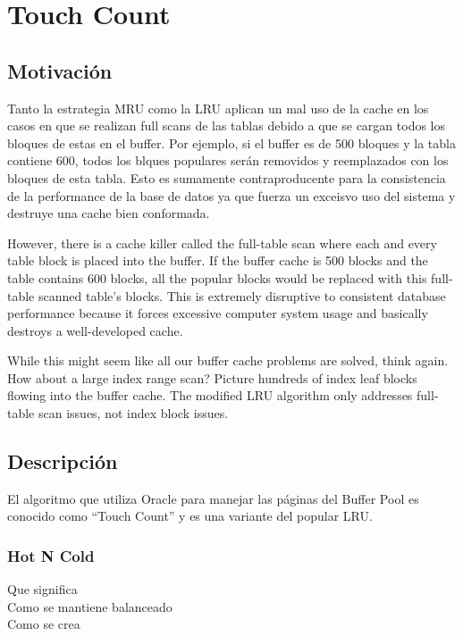 \section{Touch Count}

\subsection{Motivación}

Tanto la estrategia MRU como la LRU aplican un mal uso de la cache en los casos en que se realizan full scans de las tablas
debido a que se cargan todos los bloques de estas en el buffer. Por ejemplo, si el buffer es de 500 bloques y la tabla contiene 600,
todos los blques populares serán removidos y reemplazados con los bloques de esta tabla. Esto es sumamente contraproducente para la consistencia
de la performance de la base de datos ya que fuerza un exceisvo uso del sistema y destruye una cache bien conformada.



However, there is a cache killer called the full-table scan where each and every table block is
placed into the buffer. If the buffer cache is 500 blocks and the table contains 600 blocks, all the
popular blocks would be replaced with this full-table scanned table’s blocks. This is extremely
disruptive to consistent database performance because it forces excessive computer system usage
and basically destroys a well-developed cache.


While this might seem like all our buffer cache problems are solved, think again. How about a
large index range scan? Picture hundreds of index leaf blocks flowing into the buffer cache. The
modified LRU algorithm only addresses full-table scan issues, not index block issues.


\subsection{Descripción}
El algoritmo que utiliza Oracle para manejar las páginas del Buffer Pool es conocido
como “Touch Count” y es una variante del popular LRU.

\subsubsection{Hot N Cold}

Que significa\\
Como se mantiene balanceado \\
Como se crea\\

